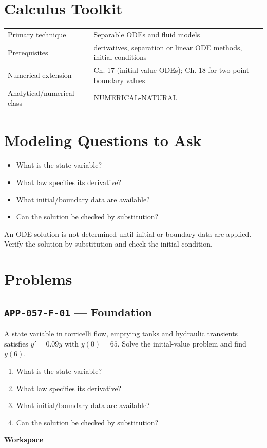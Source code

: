 \documentclass[11pt]{book}
\newcommand{\pid}[1]{\texttt{#1}}
\newcommand{\workspace}{\par\vspace{0.7in}\hrulefill\par\vspace{0.55in}\hrulefill\par}
\begin{document}
\section*{Calculus Toolkit}
\begin{tabularx}{\textwidth}{@{}lX@{}}\toprule
Primary technique & Separable ODEs and fluid models \\
Prerequisites & derivatives, separation or linear ODE methods, initial conditions \\
Numerical extension & Ch. 17 (initial-value ODEs); Ch. 18 for two-point boundary values \\
Analytical/numerical class & NUMERICAL-NATURAL \\
\bottomrule\end{tabularx}
\section*{Modeling Questions to Ask}\begin{itemize}
\item What is the state variable?
\item What law specifies its derivative?
\item What initial/boundary data are available?
\item Can the solution be checked by substitution?
\end{itemize}
\begin{errorbox}An ODE solution is not determined until initial or boundary data are applied. Verify the solution by substitution and check the initial condition.\end{errorbox}
\section*{Problems}
\subsection*{\pid{APP-057-F-01} — Foundation}
\begin{problembox}
A state variable in torricelli flow, emptying tanks and hydraulic transients satisfies $y'=0.09y$ with $y(0)=65$. Solve the initial-value problem and find $y(6)$.
\end{problembox}
\begin{promptbox}\begin{enumerate}
\item What is the state variable?
\item What law specifies its derivative?
\item What initial/boundary data are available?
\item Can the solution be checked by substitution?
\end{enumerate}\end{promptbox}
\textbf{Workspace}\workspace
{}
\end{document}
